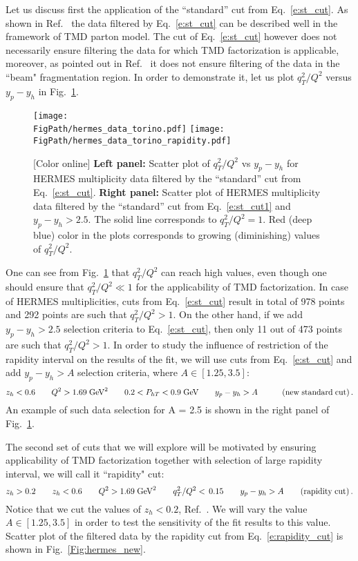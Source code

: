 \documentclass[final,3p,times,onecolumn,sort&compress,hidelinks]{elsarticle}
\newcommand\3[1]{\boldsymbol{#1}}
\newcommand*{\FigPath}{../Figs/}%
\begin{document}
Let us discuss first the application of the ``standard'' cut from Eq.~\eqref{e:st_cut}. As shown in Ref.~\cite{Anselmino:2013lza} the data filtered by Eq.~\eqref{e:st_cut} can be described well in the framework of TMD parton model. The cut of Eq.~\eqref{e:st_cut} however does not necessarily ensure filtering the data for which TMD factorization is applicable, moreover, as pointed out in Ref.~\cite{Boglione:2016bph} it does not ensure filtering of the data in the ``beam" fragmentation region. In order to demonstrate it, let us plot $q_T^2/Q^2$ versus $y_p-y_h$ in Fig.~\ref{Fig:hermes_torino}.
\begin{figure}[htb!]
\centering
\texttt{[image: \\FigPath/hermes\_data\_torino.pdf]}
\texttt{[image: \\FigPath/hermes\_data\_torino\_rapidity.pdf]}
\caption{\label{Fig:hermes_torino}
[Color online] {\bf Left panel:} Scatter plot of $q_T^2/Q^2$ vs $y_p-y_h$ for HERMES multiplicity data filtered by the ``standard'' cut from Eq.~\eqref{e:st_cut}. {\bf Right panel:} 
Scatter plot of HERMES multiplicity data filtered by the ``standard'' cut from Eq.~\eqref{e:st_cut1} and $y_p-y_h>2.5$. The solid line corresponds to $q_T^2/Q^2=1$. Red (deep blue) color in the plots corresponds to growing (diminishing) values of $q_T^2/Q^2$.
}
\end{figure}
One can see from Fig.~\ref{Fig:hermes_torino} that $q_T^2/Q^2$ can reach high values, even though one should ensure that $q_T^2/Q^2\ll 1$ for the applicability of TMD factorization. In case of HERMES multiplicities, cuts from Eq.~\eqref{e:st_cut} result in total of 978 points and 292 points are such that $q_T^2/Q^2>1$. On the other hand, if we add $y_p-y_h>2.5$ selection criteria to Eq.~\eqref{e:st_cut}, then only 11 out of 473 points are such that $q_T^2/Q^2>1$. In order to study the influence of restriction of the rapidity interval on the results of the fit, we will use cuts from Eq.~\eqref{e:st_cut} and add $y_p-y_h>A$ selection criteria, where $A \in[1.25, 3.5]$:
\begin{equation}
z_h < 0.6 \quad\quad Q^2 > 1.69 \; \textrm{GeV}^2  
\quad\quad 0.2 < P_{hT} < 0.9 \; \textrm{GeV} \quad\quad y_p-y_h > A  \quad\quad\quad{\rm (new\;standard\;cut)}\,.\label{e:st_cut1}
\end{equation}
An example of such data selection for A = 2.5 is shown in the right panel of Fig.~\ref{Fig:hermes_torino}.

The second set of cuts that we will explore will be motivated by ensuring applicability of TMD factorization together with selection of large rapidity interval, we will call it ``rapidity" cut:
\begin{equation}
z_h > 0.2 \quad\quad  z_h < 0.6 \quad\quad Q^2 > 1.69 \; \textrm{GeV}^2  
\quad\quad  q_T^2/Q^2 < \, 0.15   \quad\quad y_p-y_h > A \quad\quad{\rm (rapidity\;cut)}\,.\label{e:rapidity_cut}
\end{equation}
Notice that we cut the values of $z_h<0.2$, Ref.~\cite{schnell}. We will vary the value $A \in[1.25, 3.5]$ in order to test the sensitivity of the fit results to this value. Scatter plot of the filtered data by the rapidity cut from Eq.~\eqref{e:rapidity_cut} is shown in Fig.~\ref{Fig:hermes_new}.
\end{document}
